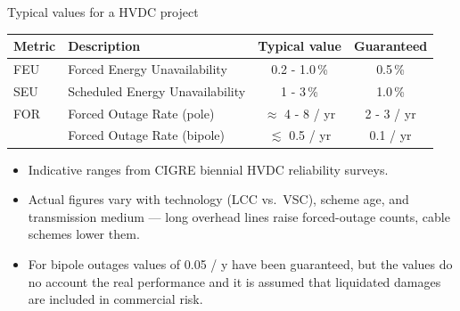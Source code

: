 
\begin{frame}{Typical values for a HVDC project}
  \centering
  \renewcommand{\arraystretch}{1.4}
  \begin{tabular}{llcc}
    \toprule
    \textbf{Metric} & \textbf{Description} & \textbf{Typical value} & \textbf{Guaranteed} \\
    \midrule
    FEU & Forced Energy Unavailability     & 0.2 - 1.0\,\%      &  0.5\,\%\\
    SEU & Scheduled Energy Unavailability  & 1 - 3\,\%          &  1.0\,\%\\
    FOR & Forced Outage Rate (pole) & $\approx$ 4 - 8 / yr &  2 - 3 / yr\\
        & Forced Outage Rate (bipole)      & $\lesssim$ 0.5 / yr  &  0.1 / yr\\
    \bottomrule
  \end{tabular}

  \vspace{1em}
  {\color{atGray}\footnotesize
    \begin{itemize}
      \item Indicative ranges from CIGRE biennial HVDC reliability surveys.
      \item Actual figures vary with technology (LCC vs.\ VSC), scheme age, and transmission medium — long overhead lines raise forced-outage counts, cable schemes lower them.
      \item For bipole outages values of 0.05 / y have been guaranteed, but the values do no account the real performance and it is assumed that liquidated damages are included in commercial risk.
    \end{itemize}   
  }
\end{frame}

